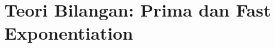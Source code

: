\documentclass[../buku_kriptografi.tex]{subfiles}
\begin{document}
\ifdefined\InMainDocument\else\setcounter{chapter}{3}\fi

\chapter{Teori Bilangan: Prima dan Fast Exponentiation}






\ifdefined\InMainDocument\else


\fi
\end{document}
